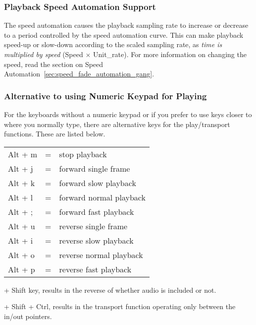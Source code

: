 \subsubsection*{Playback Speed Automation Support}%
\label{ssub:playback_speed_automation_support}


The speed automation causes the playback sampling rate to increase or decrease to a period controlled by the speed automation curve.  
This can make playback speed-up or slow-down according to the scaled sampling rate, as \textit{time is multiplied by speed} (Speed $\times$ Unit\_rate). For more information on changing
the speed, read the section on Speed Automation~\ref{sec:speed_fade_automation_gang}.

\subsubsection*{Alternative to using Numeric Keypad for Playing}%
\label{ssub:alternative_to_using_numeric_keypad_for_playing}


For the keyboards without a numeric keypad or if you prefer to use keys closer to where you normally type, there are alternative keys for the play/transport functions.  These are listed below.

\begin{tabular}{lcl}
	Alt + m&=&stop playback\\

	Alt + j&=&forward single frame\\

	Alt + k&=&forward slow playback\\

	Alt + l&=&forward normal playback\\

	Alt + ;&=&forward fast playback\\

	Alt + u&=&reverse single frame\\

	Alt + i&=&reverse slow playback\\

	Alt + o&=&reverse normal playback\\

	Alt + p&=&reverse fast playback\\
\end{tabular}
\begin{minipage}{.45\linewidth}
+ Shift key, results in the reverse of whether audio is included or not.
\vspace{1ex}

+ Shift + Ctrl, results in the transport function operating only between the in/out pointers.
\end{minipage}

